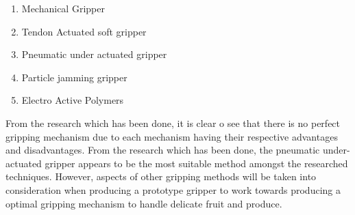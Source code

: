 \documentclass[11pt,twocolumn]{article}
\begin{document}
\begin{enumerate}
\item Mechanical Gripper
\item Tendon Actuated soft gripper
\item Pneumatic under actuated gripper
\item Particle jamming gripper
\item Electro Active Polymers
\end{enumerate}
From the research which has been done, it is clear o see that there is no perfect gripping mechanism due to each mechanism having their respective advantages and disadvantages. From the research which has been done, the pneumatic under-actuated gripper appears to be the most suitable method amongst the researched techniques. However, aspects of other gripping methods will be taken into consideration when producing a  prototype gripper to work towards producing a optimal gripping mechanism to handle delicate fruit and produce.

\begin{titlepage}
\tableofcontents
\end{titlepage}
\end{document}
